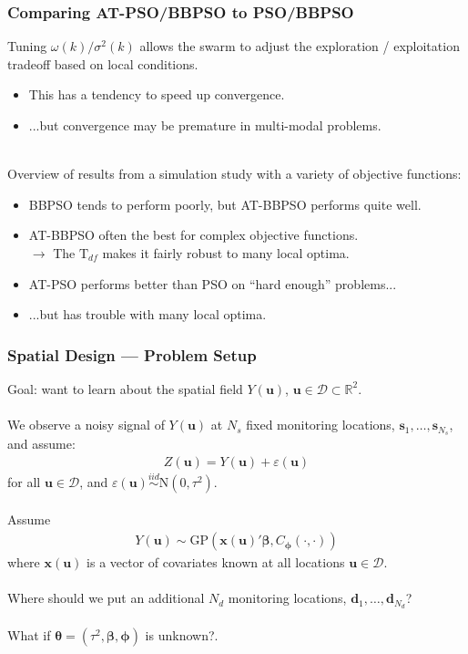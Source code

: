 \documentclass[xcolor=dvipsnames]{beamer}
\begin{document}
\begin{frame}
\frametitle{Comparing AT-PSO/BBPSO to PSO/BBPSO}
Tuning $\omega(k)/\sigma^2(k)$ allows the swarm to adjust the exploration / exploitation tradeoff based on local conditions.
\begin{itemize}
\item This has a tendency to speed up convergence.
\item ...but convergence may be premature in multi-modal problems.\\~\\
\end{itemize}

\pause

Overview of results from a simulation study with a variety of objective functions:
\begin{itemize}
\item BBPSO tends to perform poorly, but AT-BBPSO performs quite well.\\
\item AT-BBPSO often the best for complex objective functions.\\
$\to$ The $\mathrm{T}_{df}$ makes it fairly robust to many local optima.\pause 
\item AT-PSO performs better than PSO on ``hard enough'' problems... \pause
\item ...but has trouble with many local optima.
\end{itemize}
\end{frame}

\begin{frame}
\frametitle{Spatial Design --- Problem Setup}
Goal: want to learn about the spatial field $Y(\bm{u})$, $\bm{u}\in\mathcal{D}\subset \mathbb{R}^2$. \pause\\~\\

We observe a noisy signal of $Y(\bm{u})$ at $N_s$ fixed monitoring locations, $\bm{s}_1, \dots, \bm{s}_{N_s}$, 
and assume:
\begin{align*}
Z(\bm{u}) = Y(\bm{u}) + \varepsilon(\bm{u})
\end{align*}
for all $\bm{u}\in\mathcal{D}$, and $\varepsilon(\bm{u}) \stackrel{iid}{\sim} \mathrm{N}(0, \tau^2)$. \pause\\~\\

Assume 
\begin{align*}
Y(\bm{u}) \sim \mathrm{GP}(\bm{x}(\bm{u})'\bm{\beta}, C_{\bm{\phi}}(\cdot, \cdot))
\end{align*}
where $\bm{x}(\bm{u})$ is a vector of covariates known at all locations $\bm{u}\in\mathcal{D}$. \pause \\~\\

Where should we put an additional $N_d$ monitoring locations, $\bm{d}_1, \dots, \bm{d}_{N_d}$? \pause \\~\\

What if $\bm{\theta} = (\tau^2, \bm{\beta}, \bm{\phi})$ is unknown?.
\end{frame}
\end{document}
